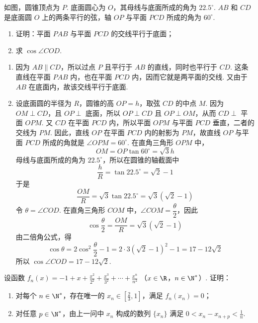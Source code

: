 \begin{problem}
如图，圆锥顶点为 \(P\). 底面圆心为 \(O\)，其母线与底面所成的角为 \(22.5^{\circ}\). \(AB\) 和 \(CD\) 是底面圆 \(O\) 上的两条平行的弦，轴 \(OP\) 与平面 \(PCD\) 所成的角为 \(60^{\circ}\).

\begin{enumerate}
\item 证明：平面 \(PAB\) 与平面 \(PCD\) 的交线平行于底面；
\item 求 \( \cos\angle COD \).
\end{enumerate}

\end{problem}

\begin{solution}
\begin{enumerate}
\item 因为 \(AB\parallel CD\)，所以过点 \(P\) 且平行于 \(AB\) 的直线，同时也平行于 \(CD\). 这条直线在平面 \(PAB\) 内，也在平面 \(PCD\) 内，因而它就是两平面的交线. 又由于 \(AB\) 在底面内，故该交线平行于底面.

   \item 设底面圆的半径为 \(R\)，圆锥的高 \(OP=h\)，取弦 \(CD\) 的中点 \(M\). 因为 \(OM\perp CD\)，且 \(OP\perp\) 底面，所以 \(OP\perp CD\) 且 \(OP\perp OM\)，从而 \(CD\perp\) 平面 \(OPM\). 又 \(CD\) 在平面 \(PCD\) 内，所以平面 \(OPM\) 与平面 \(PCD\) 垂直，二者的交线为 \(PM\). 因此，直线 \(OP\) 在平面 \(PCD\) 内的射影为 \(PM\)，故直线 \(OP\) 与平面 \(PCD\) 所成的角就是 \(\angle OPM=60^{\circ}\). 在直角三角形 \(OPM\) 中，
\[
OM=OP\tan60^{\circ}=\sqrt{3}h
\]
母线与底面所成的角为 \(22.5^{\circ}\)，所以在圆锥的轴截面中
\[
\frac{h}{R}=\tan22.5^{\circ}=\sqrt{2}-1
\]
于是
\[
\frac{OM}{R}=\sqrt{3}\tan22.5^{\circ}=\sqrt{3}(\sqrt{2}-1)
\]
令 \(\theta=\angle COD\). 在直角三角形 \(COM\) 中，\(\angle COM=\dfrac{\theta}{2}\)，因此
\[
\cos\frac{\theta}{2}=\frac{OM}{R}=\sqrt{3}(\sqrt{2}-1)
\]
由二倍角公式，得
\[
\cos\theta=2\cos^2\frac{\theta}{2}-1=2\cdot3(\sqrt{2}-1)^2-1=17-12\sqrt{2}
\]
所以 \(\cos\angle COD=17-12\sqrt{2}\).
\end{enumerate}
\end{solution}

\begin{problem}
设函数 \( f_{n}(x) = -1 + x + \frac{x^{2}}{2^{2}} + \frac{x^{3}}{3^{2}} + \cdots + \frac{x^{n}}{n^{2}}  \) （\(x \in \R\)，\(n \in \N^{*}\)）. 证明：
\begin{enumerate}
\item 对每个 \(n \in \N^*\)，存在唯一的 \(x_n \in \left[\frac{2}{3}, 1\right]\)，满足 \(f_n(x_n) = 0\)；
\item 对任意 \(p \in \N^*\)，由上一问中 \(x_n\) 构成的数列 \(\{x_n\}\) 满足 \(0 < x_n - x_{n+p} < \frac{1}{n}\).
\end{enumerate}
\end{problem}

